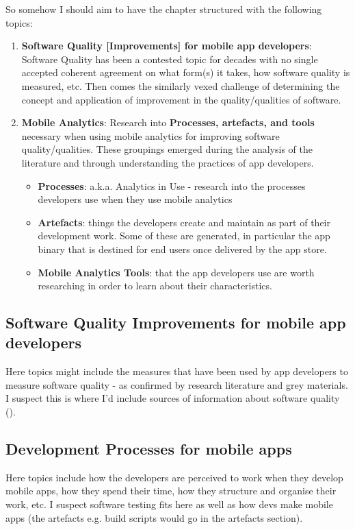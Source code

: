 So somehow I should aim to have the chapter structured with the following topics:
\begin{enumerate}
    \item \textbf{Software Quality [Improvements] for mobile app developers}: Software Quality has been a contested topic for decades with no single accepted coherent agreement on what form(s) it takes, how software quality is measured, etc. Then comes the similarly vexed challenge of determining the concept and application of improvement in the quality/qualities of software. 
    \item \textbf{Mobile Analytics}: Research into \textbf{Processes, artefacts, and tools} necessary when using mobile analytics for improving software quality/qualities. These groupings emerged during the analysis of the literature and through understanding the practices of app developers.
    \begin{itemize}
        \item \textbf{Processes}: a.k.a. Analytics in Use - research into the processes developers use when they use mobile analytics
        \item \textbf{Artefacts}: things the developers create and maintain as part of their development work. Some of these are generated, in particular the app binary that is destined for end users once delivered by the app store.
        \item \textbf{Mobile Analytics Tools}: that the app developers use are worth researching in order to learn about their characteristics.
    \end{itemize}
\end{enumerate}

\subsection*{Software Quality Improvements for mobile app developers}
Here topics might include the measures that have been used by app developers to measure software quality - as confirmed by research literature and grey materials. I suspect this is where I'd include sources of information about software quality ().

\subsection*{Development Processes for mobile apps}
Here topics include how the developers are perceived to work when they develop mobile apps, how they spend their time, how they structure and organise their work, etc. I suspect software testing fits here as well as how devs make mobile apps (the artefacts e.g. build scripts would go in the artefacts section).

